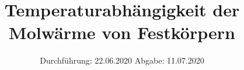 

\subject{Nr. 47}
\title{Temperaturabhängigkeit der Molwärme von Festkörpern}
\date{%
  Durchführung: 22.06.2020
  \hspace{3em}
  Abgabe: 11.07.2020
}



\maketitle
\thispagestyle{empty}
\tableofcontents
\newpage






\printbibliography{}


